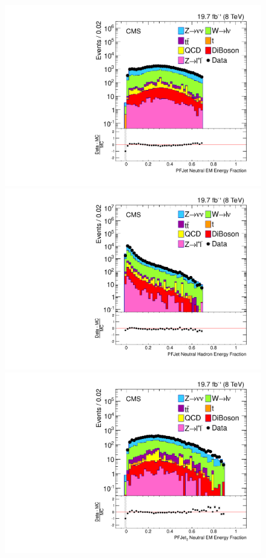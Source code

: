 \begin{figure}[!Hhtb]
\begin{center}
  \includegraphics[scale=0.30]     {Figures/sus13009/cut/PFAK5JetNeuEmEngFrac.pdf}
  \includegraphics[scale=0.30]     {Figures/sus13009/cut/PFAK5JetNeuHadEngFrac.pdf}
  \includegraphics[scale=0.30]     {Figures/sus13009/cut/PFAK5JetNeuEmEngFrac2.pdf}

\end{center}
\end{figure}
